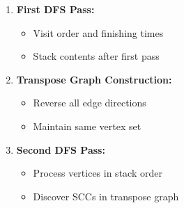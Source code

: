 \documentclass{book}
\theoremstyle{definition}
\begin{document}
\begin{enumerate}
    \item \textbf{First DFS Pass:}
    \begin{itemize}
        \item Visit order and finishing times
        \item Stack contents after first pass
    \end{itemize}
    
    \item \textbf{Transpose Graph Construction:}
    \begin{itemize}
        \item Reverse all edge directions
        \item Maintain same vertex set
    \end{itemize}
    
    \item \textbf{Second DFS Pass:}
    \begin{itemize}
        \item Process vertices in stack order
        \item Discover SCCs in transpose graph
    \end{itemize}
\end{enumerate}
\end{document}

